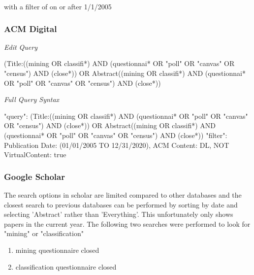 \noindent
with a filter of on or after 1/1/2005

\subsubsection{ACM Digital}
\noindent
\textit{Edit Query}

\noindent
(Title:((mining OR classifi*) AND (questionnai* OR "poll" OR "canvas" OR "census") AND (close*)) OR Abstract((mining OR classifi*) AND (questionnai*  OR "poll" OR "canvas" OR "census") AND (close*))

\noindent
\textit{Full Query Syntax}

\noindent
"query": { (Title:((mining OR classifi*) AND (questionnai* OR "poll" OR "canvas" OR "census") AND (close*)) OR Abstract((mining OR classifi*) AND (questionnai* OR "poll" OR "canvas" OR "census") AND (close*))}
"filter": { Publication Date: (01/01/2005 TO 12/31/2020), ACM Content: DL, NOT VirtualContent: true }

\subsubsection{Google Scholar}
\noindent
The search options in scholar are limited compared to other databases and the closest search to previous databases can be performed by sorting by date and selecting 'Abstract' rather than 'Everything'. This unfortunately only shows papers in the current year. The following two searches were performed to look for "mining" or "classification"

\begin{enumerate}
  \item  mining questionnaire closed
  \item  classification questionnaire closed
\end{enumerate}


